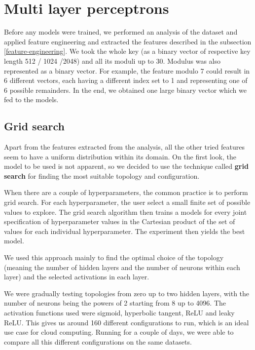\section{Multi layer perceptrons}

Before any models were trained, we performed an analysis of the dataset and applied feature engineering and extracted the features described in the subsection \ref{feature-engineering}. We took the whole key (as a binary vector of respective key length 512 / 1024 /2048) and all its moduli up to 30. Modulus was also represented as a binary vector. For example, the feature modulo 7 could result in 6 different vectors, each having a different index set to 1 and representing one of 6 possible remainders. In the end, we obtained one large binary vector which we fed to the models.

\subsection*{Grid search}

Apart from the features extracted from the analysis, all the other tried features seem to have a uniform distribution within its domain. On the first look, the model to be used is not apparent, so we decided to use the technique called \textbf{grid search}\cite{grid-search} for finding the most suitable topology and configuration. 

When there are a couple of hyperparameters, the common practice is to perform grid search. For each hyperparameter, the user select a small finite set of possible values to explore. The grid search algorithm then trains a models for every joint specification of hyperparameter values in the Cartesian product of the set of values for each individual hyperparameter. The experiment then yields the best model.

We used this approach mainly to find the optimal choice of the topology (meaning the number of hidden layers and the number of neurons within each layer) and the selected activations in each layer.

We were gradually testing topologies from zero up to two hidden layers, with the number of neurons being the powers of 2 starting from 8 up to 4096. The activation functions used were sigmoid, hyperbolic tangent, ReLU and leaky ReLU. This gives us around 160 different configurations to run, which is an ideal use case for cloud computing. Running for a couple of days, we were able to compare all this different configurations on the same datasets.

